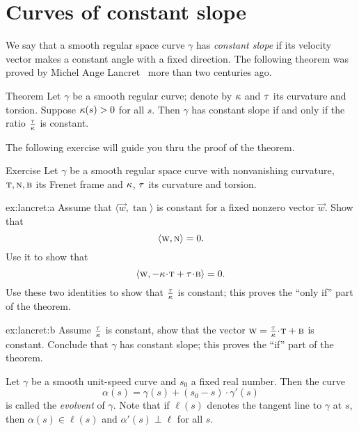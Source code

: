 \section{Curves of constant slope}

We say that a smooth regular space curve $\gamma$ has \emph{constant slope} if its velocity vector makes a constant angle with a fixed direction.
The following theorem was proved by Michel Ange Lancret~\cite{lancret} more than two centuries ago.

\begin{thm}{Theorem}\label{thm:const-slope}
Let $\gamma$ be a smooth regular curve;
denote by $\kappa$ and $\tau$ its curvature and torsion.
Suppose $\kappa(s)>0$ for all $s$.
Then $\gamma$ has constant slope if and only if the ratio $\tfrac{\tau}{\kappa}$ is constant.
\end{thm}

The following exercise will guide you thru the proof of the theorem. 

\begin{thm}{Exercise} \label{ex:lancret}
Let $\gamma$ be a smooth regular space curve with nonvanishing curvature, $\text{\sc{t}},\text{\sc{n}},\text{\sc{b}}$ 
its Frenet frame and $\kappa$, $\tau$ its curvature and torsion.


\begin{subthm}{ex:lancret:a}
Assume that  $\langle \vec w,\tan\rangle$ is constant for a fixed nonzero vector $\vec w$.
Show that 
\[\langle \text{\sc{w}}, \text{\sc{n}}\rangle =0.\]
Use it to show that 
\[\langle \vec w, -\kur\cdot\tan+\tor\cdot \bi\rangle =0.\]
Use these two identities to show that $\tfrac{\tau}{\kappa}$ is constant;
this proves the ``only if'' part of the theorem.
\end{subthm}

\begin{subthm}{ex:lancret:b} Assume $\tfrac{\tau}{\kappa}$ is constant, show that the vector $\vec w=\tfrac\tor\kur\cdot \tan+\bi$ is constant.
Conclude that $\gamma$ has constant slope; this proves the ``if'' part of the theorem.
\end{subthm}

\end{thm}

Let $\gamma$ be a smooth unit-speed curve and $s_0$ a fixed real number. 
Then the curve 
\[\alpha(s)=\gamma(s)+(s_0-s)\cdot \gamma'(s)\]
is called the \emph{evolvent} of $\gamma$.
Note that if $\ell(s)$ denotes the tangent line to $\gamma$ at $s$,
then $\alpha(s)\in \ell(s)$ and $\alpha'(s)\perp \ell$ for all $s$.

